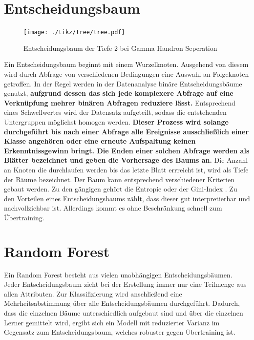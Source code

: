 \section{Entscheidungsbaum}
\begin{figure}
  \centering
  \texttt{[image: ./tikz/tree/tree.pdf]}
  \caption{Entscheidungsbaum der Tiefe 2 bei Gamma Handron Seperation}
\end{figure}
Ein Entscheidungsbaum beginnt mit einem Wurzelknoten. Ausgehend von diesem wird durch Abfrage von verschiedenen Bedingungen eine Auswahl an Folgeknoten getroffen. 
In der Regel werden in der Datenanalyse binäre Entscheidungsbäume genutzt, \textbf{aufgrund dessen das sich jede komplexere Abfrage auf eine Verknüpfung mehrer binären Abfragen reduziere lässt.}
Entsprechend eines Schwellwertes wird der Datensatz aufgeteilt, sodass die entstehenden Untergruppen möglichst homogen werden. 
\textbf{Dieser Prozess wird solange durchgeführt bis nach einer Abfrage alle Ereignisse ausschließlich einer Klasse angehören oder eine erneute Aufspaltung keinen Erkenntnissgewinn bringt. Die Enden einer solchen Abfrage werden als Blätter bezeichnet und geben die Vorhersage des Baums an.}
Die Anzahl an Knoten die durchlaufen werden bis das letzte Blatt errreicht ist, wird als Tiefe der Bäume bezeichnet.
Der Baum kann entsprechend verschiedener Kriterien gebaut werden.
Zu den gängigen gehört die Entropie oder der Gini-Index \cite{MAchineLearningBook}. 
Zu den Vorteilen eines Entscheidungsbaums zählt, dass dieser gut interpretierbar und nachvollziehbar ist. 
Allerdings kommt es ohne Beschränkung schnell zum Übertraining.
\section{Random Forest}
Ein Random Forest besteht aus vielen unabhängigen Entscheidungsbäumen.
Jeder Entscheidungsbaum zieht bei der Erstellung immer nur eine Teilmenge aus allen Attributen.
Zur Klassifizierung wird anschließend eine Mehrheitsabstimmung über alle Entscheidungsbäumen durchgeführt.
Dadurch, dass die einzelnen Bäume unterschiedlich aufgebaut sind und über die einzelnen Lerner gemittelt wird, ergibt sich ein Modell mit reduzierter Varianz im Gegensatz zum Entscheidungsbaum, welches robuster gegen Übertraining ist.
